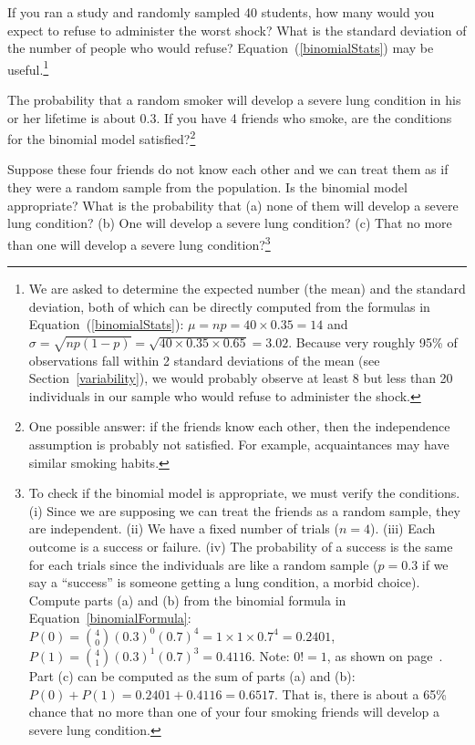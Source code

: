 \begin{exercise}
If you ran a study and randomly sampled 40 students, how many would you expect to refuse to administer the worst shock? What is the standard deviation of the number of people who would refuse? Equation~(\ref{binomialStats}) may be useful.\footnote{We are asked to determine the expected number (the mean) and the standard deviation, both of which can be directly computed from the formulas in Equation~(\ref{binomialStats}): $\mu=np = 40\times 0.35 = 14$ and $\sigma = \sqrt{np(1-p)} = \sqrt{40\times 0.35\times 0.65} = 3.02$. Because very roughly 95\% of observations fall within 2 standard deviations of the mean (see Section~\ref{variability}), we would probably observe at least 8 but less than 20 individuals in our sample who would refuse to administer the shock.}
\end{exercise}

\begin{exercise}
The probability that a random smoker will develop a severe lung condition in his or her lifetime is about $0.3$. If you have 4 friends who smoke, are the conditions for the binomial model satisfied?\footnote{One possible answer: if the friends know each other, then the independence assumption is probably not satisfied. For example, acquaintances may have similar smoking habits.}
\end{exercise}

\begin{exercise}
\label{noMoreThanOneFriendWSevereLungCondition}%
Suppose these four friends do not know each other and we can treat them as if they were a random sample from the population. Is the binomial model appropriate? What is the probability that (a) none of them will develop a severe lung condition? (b) One will develop a severe lung condition? (c) That no more than one will develop a severe lung condition?\footnote{To check if the binomial model is appropriate, we must verify the conditions. (i) Since we are supposing we can treat the friends as a random sample, they are independent. (ii) We have a fixed number of trials ($n=4$). (iii) Each outcome is a success or failure. (iv) The probability of a success is the same for each trials since the individuals are like a random sample ($p=0.3$ if we say a ``success'' is someone getting a lung condition, a morbid choice). Compute parts (a) and (b) from the binomial formula in Equation~\eqref{binomialFormula}: $P(0) =  {4 \choose 0} (0.3)^0 (0.7)^4 = 1\times1\times0.7^4 = 0.2401$, $P(1) = {4 \choose 1} (0.3)^1(0.7)^{3} = 0.4116$. Note: $0!=1$, as shown on page~\pageref{zeroFactorial}. Part (c) can be computed as the sum of parts (a) and (b): $P(0) + P(1) = 0.2401 + 0.4116 = 0.6517$. That is, there is about a 65\% chance that no more than one of your four smoking friends will develop a severe lung condition.}
\end{exercise}

